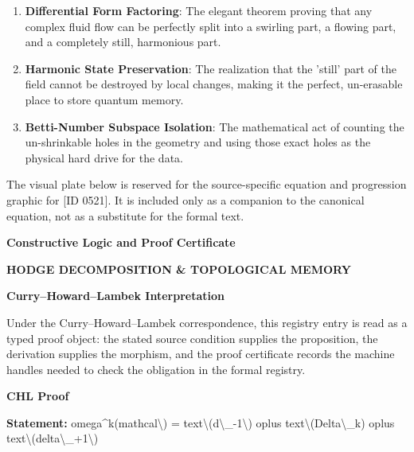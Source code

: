 \begin{enumerate}[leftmargin=1.6em,itemsep=6pt,topsep=4pt]
\item \textbf{Differential Form Factoring}: The elegant theorem proving that any complex fluid flow can be perfectly split into a swirling part, a flowing part, and a completely still, harmonious part.
\item \textbf{Harmonic State Preservation}: The realization that the 'still' part of the field cannot be destroyed by local changes, making it the perfect, un-erasable place to store quantum memory.
\item \textbf{Betti-Number Subspace Isolation}: The mathematical act of counting the un-shrinkable holes in the geometry and using those exact holes as the physical hard drive for the data.
\end{enumerate}

\begingroup\footnotesize\sloppy
The visual plate below is reserved for the source-specific equation and progression graphic for [ID 0521]. It is included only as a companion to the canonical equation, not as a substitute for the formal text.
\par\endgroup
\ifTZPDarkEdition
{}
\fi

\clearpage
\begingroup\tzpsupportsetup
\noindent\textbf{\fontsize{10.8pt}{12.8pt}\selectfont [ID 0521] Constructive Logic and Proof Certificate}\par
\noindent\textbf{\fontsize{10pt}{12pt}\selectfont HODGE DECOMPOSITION \& TOPOLOGICAL MEMORY}\par
\vspace{0.45em}
\begingroup
\footnotesize
\setlength{\parskip}{0.22em}
\setlength{\parindent}{0pt}
\noindent\textbf{Curry--Howard--Lambek Interpretation}\par
Under the Curry--Howard--Lambek correspondence, this registry entry is read as a typed proof
object: the stated source condition supplies the proposition, the derivation supplies the
morphism, and the proof certificate records the machine handles needed to check the obligation
in the formal registry.

\vspace{0.45em}
\noindent\textbf{CHL Proof}\par
\textbf{Statement:} omega\textasciicircum{}k(mathcal\textbackslash{}) = text\textbackslash{}(d\textbackslash{}\_-1\textbackslash{}) oplus text\textbackslash{}(Delta\textbackslash{}\_k) oplus text\textbackslash{}(delta\textbackslash{}\_+1\textbackslash{})

